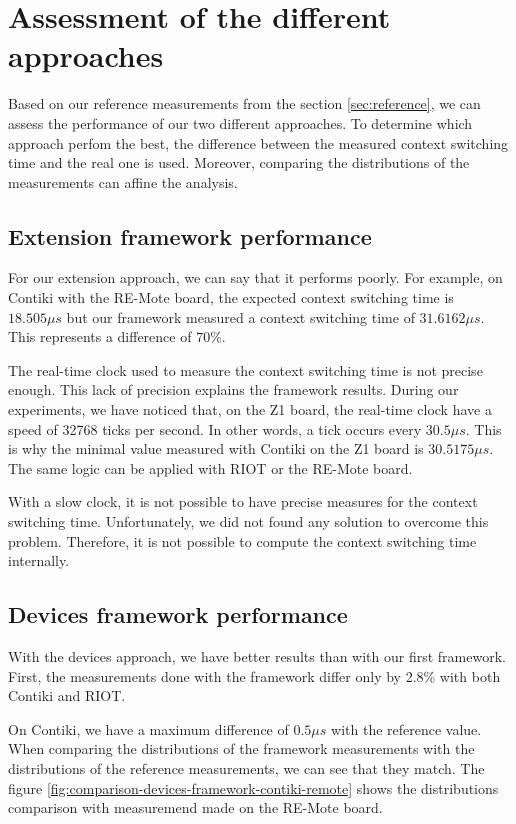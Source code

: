\section{Assessment of the different approaches}

Based on our reference measurements from the section \ref{sec:reference}, we can assess the performance of our two different approaches.
To determine which approach perfom the best, the difference between the measured context switching time and the real one is used.
Moreover, comparing the distributions of the measurements can affine the analysis.

\subsection{Extension framework performance}

For our extension approach, we can say that it performs poorly.
For example, on Contiki with the RE-Mote board, the expected context switching time is $18.505\mu s$ but our framework measured a context switching time of $31.6162\mu s$.
This represents a difference of $70\%$.

The real-time clock used to measure the context switching time is not precise enough.
This lack of precision explains the framework results.
During our experiments, we have noticed that, on the Z1 board, the real-time clock have a speed of 32768 ticks per second.
In other words, a tick occurs every $30.5\mu s$.
This is why the minimal value measured with Contiki on the Z1 board is $30.5175\mu s$.
The same logic can be applied with RIOT or the RE-Mote board.

With a slow clock, it is not possible to have precise measures for the context switching time.
Unfortunately, we did not found any solution to overcome this problem.
Therefore, it is not possible to compute the context switching time internally.

\subsection{Devices framework performance}

With the devices approach, we have better results than with our first framework.
First, the measurements done with the framework differ only by 2.8\% with both Contiki and RIOT.

On Contiki, we have a maximum difference of $0.5\mu s$ with the reference value.
When comparing the distributions of the framework measurements with the distributions of the reference measurements, we can see that they match.
The figure \ref{fig:comparison-devices-framework-contiki-remote} shows the distributions comparison with measuremend made on the RE-Mote board.

